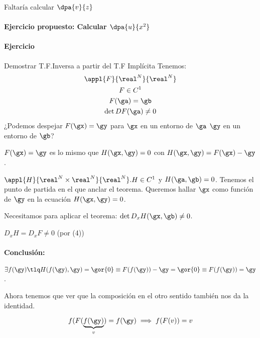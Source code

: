 Faltaría  calcular $\dpa{v}{z}$

\paragraph{Ejercicio propuesto: Calcular $\dpa{u}{x^2}$}

\paragraph{Ejercicio} Demostrar T.F.Inversa a partir del T.F Implícita
Tenemos:
\begin{gather}
 \appl{F}{\real^N}{\real^N}\\
 F\in C^1\\
 F(\ga) = \gb\\
 \det DF(\ga) \neq 0
\end{gather}
¿Podemos despejar $F(\gx) = \gy$ para $\gx$ en un entorno de $\ga$ $\gy$ en un entorno de $\gb$?

$F(\gx) = \gy$ es lo mismo que $H(\gx,\gy) = 0$ con $H(\gx,\gy) = F(\gx)-\gy$.

$\appl{H}{\real^N\times \real^N}{\real^N}. H\in C^1$ y $H(\ga,\gb) = 0$. Tenemos el punto de partida en el que anclar el teorema. Queremos hallar $\gx$ como función de $\gy$ en la ecuación $H(\gx,\gy) = 0$.

Necesitamos para aplicar el teorema: $\det D_x H(\gx,\gb) \neq 0$.

\obs $D_x H  = D_x F \neq 0$ (por (4))

\paragraph{Conclusión:} $\exists f(\gy) \tlq H(f(\gy),\gy) = \gor{0} \equiv F(f(\gy)) - \gy = \gor{0} \equiv F(f(\gy)) = \gy$.

Ahora tenemos que ver que la composición en el otro sentido también nos da la identidad.

\[f(F(\underbrace{f(\gy)}_{v}) = f(\gy) \implies f(F(v)) = v\]
